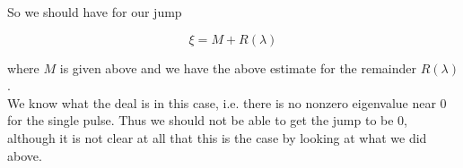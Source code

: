\documentclass[12pt]{article}
\begin{document}
So we should have for our jump

\[
\xi = M + R(\lambda)
\]

where $M$ is given above and we have the above estimate for the remainder $R(\lambda)$.\\

We know what the deal is in this case, i.e. there is no nonzero eigenvalue near 0 for the single pulse. Thus we should not be able to get the jump to be 0, although it is not clear at all that this is the case by looking at what we did above.
\end{document}
